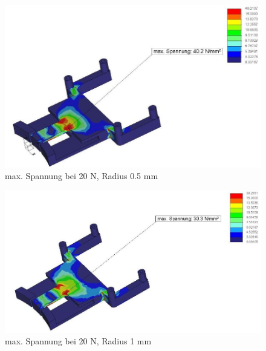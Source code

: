 			\begin{figure}[H]
			\begin{centering}
			\includegraphics[width = 1.1\textwidth]{Bilder/max_spannung_f20_r0_5}
			\par\end{centering}
			\caption{max. Spannung bei 20 N, Radius 0.5 mm}
			\label{max_spannung_f20_r0_5}
			\end{figure}

			\begin{figure}[H]
			\begin{centering}
			\includegraphics[width = 1.1\textwidth]{Bilder/max_spannung_f20_r1}
			\par\end{centering}
			\caption{max. Spannung bei 20 N, Radius 1 mm}
			\label{max_spannung_f20_r1}
			\end{figure}


